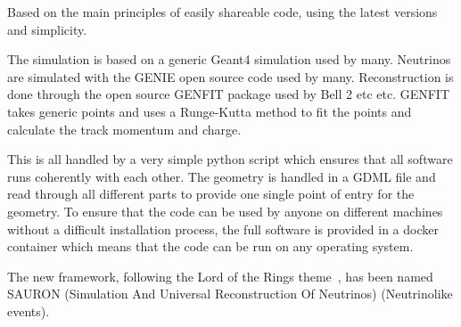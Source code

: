 Based on the main principles of easily shareable code, using the latest versions and simplicity.

The simulation is based on a generic Geant4 simulation used by many. Neutrinos are simulated with the GENIE open source code used by many. Reconstruction is done through the open source GENFIT package used by Bell 2 etc etc. GENFIT takes generic points and uses a Runge-Kutta method to fit the points and calculate the track momentum and charge.

This is all handled by a very simple python script which ensures that all software runs coherently with each other. The geometry is handled in a GDML file and read through all different parts to provide one single point of entry for the geometry. To ensure that the code can be used by anyone on different machines without a difficult installation process, the full software is provided in a docker container which means that the code can be run on any operating system. 

The new framework, following the Lord of the Rings theme~\cite{79tolkien2012lord}, has been named SAURON (Simulation And Universal Reconstruction Of Neutrinos) (Neutrinolike events).



